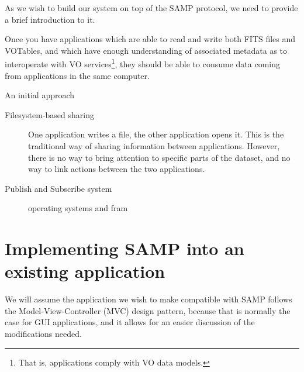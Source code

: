 		\invisiblenote
		{As we wish to build our system on top of the SAMP protocol,
		we need to provide a brief introduction to it.
		
		Once you have applications which are able to read and
		write both FITS files and VOTables, and which have enough
		understanding of associated metadata as to
		interoperate with VO services\footnote{That is, applications
		comply with VO data models.}, they should be able to
		consume data coming from applications in the same
		computer.
		
		An initial approach
		\begin{description}
			\item[Filesystem-based sharing] One application writes a
			file, the other application opens it. This is the
			traditional way of sharing information between
			applications. However, there is no way to bring
			attention to specific parts of the dataset, and no
			way to link actions between the two applications.
			
			\item[Publish and Subscribe system] 
			operating systems and fram
		\end{description}}
		
		
	
	\section{Implementing SAMP into an existing application} %
	\label{sec:implementing_samp_into_an_existing_application}
		
		We will assume the application we wish to make compatible
		with SAMP follows the Model-View-Controller (MVC) design
		pattern, because that is normally the case for GUI
		applications, and it allows for an easier discussion of
		the modifications needed.
		

